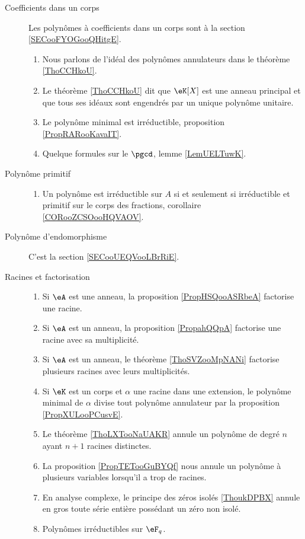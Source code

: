 \begin{description}
    \item[Coefficients dans un corps]
Les polynômes à coefficients dans un corps sont à la section \ref{SECooFYOGooQHitgE}.
        \begin{enumerate}
                
\item
Nous parlons de l'idéal des polynômes annulateurs dans le théorème \ref{ThoCCHkoU}.
            \item
                Le théorème \ref{ThoCCHkoU} dit que \( \eK[X]\) est une anneau principal et que tous ses idéaux sont engendrés par un unique polynôme unitaire.
            \item
                Le polynôme minimal est irréductible, proposition \ref{PropRARooKavaIT}.
            \item
                Quelque formules sur le \( \pgcd\), lemme \ref{LemUELTuwK}.
        \end{enumerate}
    \item[Polynôme primitif]
    
        \begin{enumerate}
            \item
                Un polynôme est irréductible sur \( A\) si et seulement si irréductible et primitif sur le corps des fractions, corollaire \ref{CORooZCSOooHQVAOV}.
        \end{enumerate}

    \item[Polynôme d'endomorphisme]
        C'est la section \ref{SECooUEQVooLBrRiE}.

    \item[Racines et factorisation]

    \begin{enumerate}
        \item
            Si \( \eA\) est une anneau, la proposition \ref{PropHSQooASRbeA} factorise une racine.
        \item
            Si \( \eA\) est un anneau, la proposition \ref{PropahQQpA} factorise une racine avec sa multiplicité.
        \item
            Si \( \eA\) est un anneau, le théorème \ref{ThoSVZooMpNANi} factorise plusieurs racines avec leurs multiplicités.
        \item
            Si \( \eK\) est un corps et \( \alpha\) une racine dans une extension, le polynôme minimal de \( \alpha\) divise tout polynôme annulateur par la proposition \ref{PropXULooPCusvE}.
        \item
            Le théorème \ref{ThoLXTooNaUAKR} annule un polynôme de degré \( n\) ayant \( n+1\) racines distinctes.
        \item
            La proposition \ref{PropTETooGuBYQf} nous annule un polynôme à plusieurs variables lorsqu'il a trop de racines.
        \item
            En analyse complexe, le principe des zéros isolés \ref{ThoukDPBX} annule en gros toute série entière possédant un zéro non isolé.
        \item 
            Polynômes irréductibles sur \( \eF_q\).
        \end{enumerate}

\end{description}



